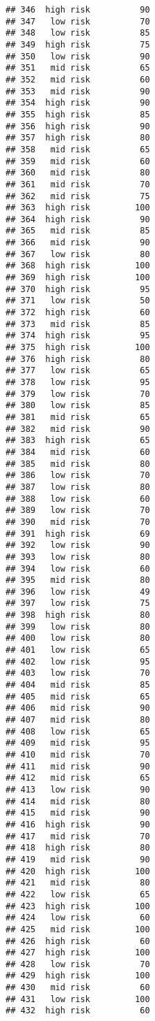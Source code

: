 \documentclass[
  ignorenonframetext,
]{beamer}
\begin{document}
\begin{frame}[fragile]
\begin{verbatim}
## 346  high risk          90
## 347   low risk          70
## 348   low risk          85
## 349  high risk          75
## 350   low risk          90
## 351   mid risk          65
## 352   mid risk          60
## 353   mid risk          90
## 354  high risk          90
## 355  high risk          85
## 356  high risk          90
## 357  high risk          80
## 358   mid risk          65
## 359   mid risk          60
## 360   mid risk          80
## 361   mid risk          70
## 362   mid risk          75
## 363  high risk         100
## 364  high risk          90
## 365   mid risk          85
## 366   mid risk          90
## 367   low risk          80
## 368  high risk         100
## 369  high risk         100
## 370  high risk          95
## 371   low risk          50
## 372  high risk          60
## 373   mid risk          85
## 374  high risk          95
## 375  high risk         100
## 376  high risk          80
## 377   low risk          65
## 378   low risk          95
## 379   low risk          70
## 380   low risk          85
## 381   mid risk          65
## 382   mid risk          90
## 383  high risk          65
## 384   mid risk          60
## 385   mid risk          80
## 386   low risk          70
## 387   low risk          80
## 388   low risk          60
## 389   low risk          70
## 390   mid risk          70
## 391  high risk          69
## 392   low risk          90
## 393   low risk          80
## 394   low risk          60
## 395   mid risk          80
## 396   low risk          49
## 397   low risk          75
## 398  high risk          80
## 399   low risk          80
## 400   low risk          80
## 401   low risk          65
## 402   low risk          95
## 403   low risk          70
## 404   mid risk          85
## 405   mid risk          65
## 406   mid risk          90
## 407   mid risk          80
## 408   low risk          65
## 409   mid risk          95
## 410   mid risk          70
## 411   mid risk          90
## 412   mid risk          65
## 413   low risk          90
## 414   mid risk          80
## 415   mid risk          90
## 416  high risk          90
## 417   mid risk          70
## 418  high risk          80
## 419   mid risk          90
## 420  high risk         100
## 421   mid risk          80
## 422   low risk          65
## 423  high risk         100
## 424   low risk          60
## 425   mid risk         100
## 426  high risk          60
## 427  high risk         100
## 428   low risk          70
## 429  high risk         100
## 430   mid risk          60
## 431   low risk         100
## 432  high risk          60

\end{verbatim}
\end{frame}
\end{document}
